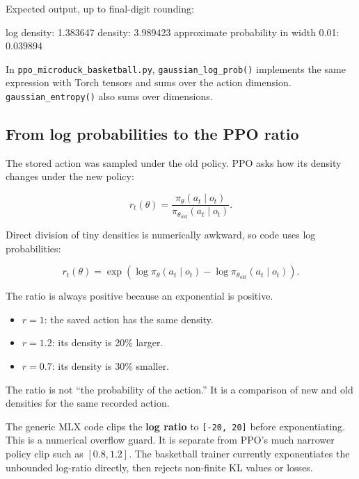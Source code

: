 \documentclass[
  american,
  11pt,
  letterpaper,
]{article}
\newenvironment{Shaded}{\begin{snugshade}}{\end{snugshade}}
\newcommand{\NormalTok}[1]{#1}
\providecommand{\tightlist}{%
  \setlength{\itemsep}{0pt}\setlength{\parskip}{0pt}}
\renewenvironment{Shaded}{\par\smallskip}{\par\smallskip}
\begin{document}
Expected output, up to final-digit rounding:

\begin{Shaded}
\begin{Highlighting}[]
\NormalTok{log density: 1.383647}
\NormalTok{density: 3.989423}
\NormalTok{approximate probability in width 0.01: 0.039894}
\end{Highlighting}
\end{Shaded}

In
\texttt{ppo\_\allowbreak{}microduc\allowbreak{}k\_\allowbreak{}basketba\allowbreak{}ll.py},
\texttt{gaussian\_log\_prob()} implements the same expression with Torch
tensors and sums over the action dimension. \texttt{gaussian\_entropy()}
also sums over dimensions.

\subsection{From log probabilities to the PPO
ratio}\label{from-log-probabilities-to-the-ppo-ratio}

The stored action was sampled under the old policy. PPO asks how its
density changes under the new policy:

\[
r_t(\theta)
=
\frac{\pi_\theta(a_t\mid o_t)}
{\pi_{\theta_{\mathrm{old}}}(a_t\mid o_t)}.
\]

Direct division of tiny densities is numerically awkward, so code uses
log probabilities:

\[
r_t(\theta)
=
\exp\left(
\log\pi_\theta(a_t\mid o_t)
-
\log\pi_{\theta_{\mathrm{old}}}(a_t\mid o_t)
\right).
\]

The ratio is always positive because an exponential is positive.

\begin{itemize}
\tightlist
\item
  \(r=1\): the saved action has the same density.
\item
  \(r=1.2\): its density is 20\% larger.
\item
  \(r=0.7\): its density is 30\% smaller.
\end{itemize}

The ratio is not ``the probability of the action.'' It is a comparison
of new and old densities for the same recorded action.

The generic MLX code clips the \textbf{log ratio} to
\texttt{{[}-20,\ 20{]}} before exponentiating. This is a numerical
overflow guard. It is separate from PPO's much narrower policy clip such
as \([0.8,1.2]\). The basketball trainer currently exponentiates the
unbounded log-ratio directly, then rejects non-finite KL values or
losses.
\end{document}

